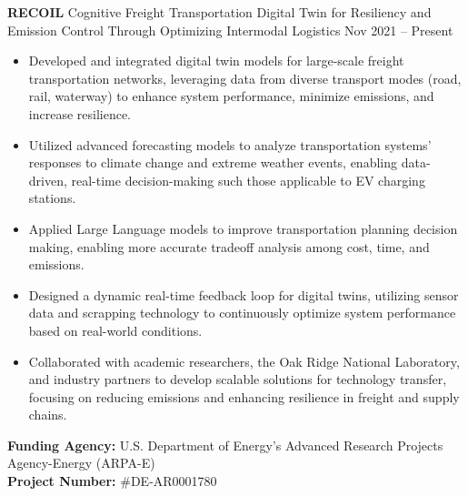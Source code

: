 \documentclass[10pt, letterpaper]{article}
\newenvironment{highlights}{
    \begin{itemize}[
        topsep=0.10 cm,
        parsep=0.10 cm,
        partopsep=0pt,
        itemsep=0pt,
        leftmargin=0 cm + 10pt
    ]
}{
    \end{itemize}
} %
\newenvironment{twocolentry}[2][]{
    \onecolentry
    \def\secondColumn{#2}
    \setcolumnwidth{\fill, 4.5 cm}
    \begin{paracol}{2}
}{
    \switchcolumn \raggedleft \secondColumn
    \end{paracol}
    \endonecolentry
} %
\begin{document}
        \begin{twocolentry}{Nov 2021 – Present} \textbf{RECOIL} \textbar Cognitive Freight Transportation Digital Twin for Resiliency and Emission Control Through Optimizing Intermodal Logistics \end{twocolentry} \begin{highlights} \item Developed and integrated digital twin models for large-scale freight transportation networks, leveraging data from diverse transport modes (road, rail, waterway) to enhance system performance, minimize emissions, and increase resilience. 
            \item Utilized advanced forecasting models to analyze transportation systems' responses to climate change and extreme weather events, enabling data-driven, real-time decision-making such those applicable to EV charging stations. 
            \item Applied Large Language models to improve transportation planning decision making, enabling more accurate tradeoff analysis among cost, time, and emissions. 
            \item Designed a dynamic real-time feedback loop for digital twins, utilizing sensor data and scrapping technology to continuously optimize system performance based on real-world conditions.
             \item Collaborated with academic researchers, the Oak Ridge National Laboratory, and industry partners to develop scalable solutions for technology transfer, focusing on reducing emissions and enhancing resilience in freight and supply chains. \\
            \end{highlights} \vspace{0.3cm} \noindent \textbf{Funding Agency:} U.S. Department of Energy’s Advanced Research Projects Agency-Energy (ARPA-E)\\  \textbf{Project Number:} \#DE-AR0001780
\end{document}
